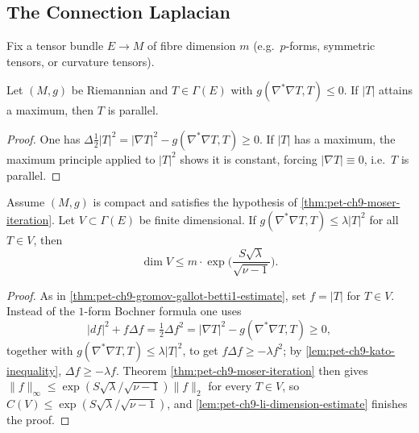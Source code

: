 \subsection{The Connection Laplacian}

Fix a tensor bundle $E\to M$ of fibre dimension $m$ (e.g.\ $p$-forms,
symmetric tensors, or curvature tensors).

\begin{proposition}[Proposition 9.3.1]
  \label{prop:pet-ch9-vanishing-connection-laplacian}
  Let $(M,g)$ be Riemannian and $T\in\Gamma(E)$ with $g(\nabla^*\nabla T,T)\le0$.
  If $|T|$ attains a maximum, then $T$ is parallel.
\end{proposition}
\begin{proof}
  One has $\Delta\tfrac12|T|^2=|\nabla T|^2-g(\nabla^*\nabla T,T)\ge0$. If $|T|$
  has a maximum, the maximum principle applied to $|T|^2$ shows it is
  constant, forcing $|\nabla T|\equiv0$, i.e.\ $T$ is parallel.
\end{proof}

\begin{theorem}
  \label{thm:pet-ch9-gallot-connection-laplacian-estimate}
  Assume $(M,g)$ is compact and satisfies the hypothesis of
  \cref{thm:pet-ch9-moser-iteration}. Let $V\subset\Gamma(E)$ be finite
  dimensional. If $g(\nabla^*\nabla T,T)\le\lambda|T|^2$ for all $T\in V$, then
  \[
    \dim V\le m\cdot\exp\Big(\frac{S\sqrt\lambda}{\sqrt{\nu-1}}\Big).
  \]
\end{theorem}
\begin{proof}
  As in \cref{thm:pet-ch9-gromov-gallot-betti1-estimate}, set $f=|T|$ for
  $T\in V$. Instead of the $1$-form Bochner formula one uses
  \[
    |df|^2+f\Delta f=\tfrac12\Delta f^2=|\nabla T|^2-g(\nabla^*\nabla T,T)\ge0,
  \]
  together with $g(\nabla^*\nabla T,T)\le\lambda|T|^2$, to get $f\Delta f\ge
  -\lambda f^2$; by \cref{lem:pet-ch9-kato-inequality}, $\Delta f\ge-\lambda f$.
  Theorem \ref{thm:pet-ch9-moser-iteration} then gives $\|f\|_\infty\le
  \exp(S\sqrt\lambda/\sqrt{\nu-1})\|f\|_2$ for every $T\in V$, so
  $C(V)\le\exp(S\sqrt\lambda/\sqrt{\nu-1})$, and
  \cref{lem:pet-ch9-li-dimension-estimate} finishes the proof.
\end{proof}

